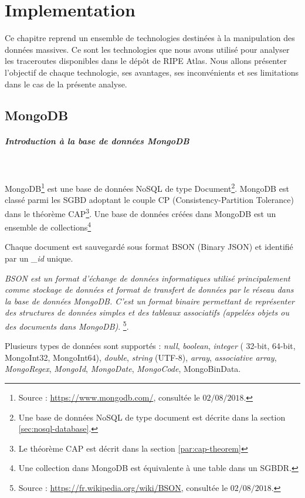 \chapter{Implementation}

Ce chapitre reprend un ensemble de   technologies destinées  à la manipulation des données massives. Ce sont les technologies que nous avons utilisé pour analyser les traceroutes disponibles dans le dépôt de RIPE Atlas. Nous allons présenter l'objectif de chaque technologie, ses avantages, ses inconvénients et ses limitations dans le cas de la présente analyse.


\section{MongoDB}

\paragraph{Introduction à la base de données MongoDB} \label{subsubsection:mongodb}~

MongoDB\footnote{Source : \url{https://www.mongodb.com/}, consultée le $02/08/2018$.} est une base de données  NoSQL de type Document\footnote{Une base de données NoSQL de type document est décrite dans la section \ref{sec:nosql-database}.}.  MongoDB est classé parmi les  SGBD adoptant le couple CP (Consistency-Partition Tolerance) dans le théorème  CAP\footnote{Le théorème  CAP est décrit dans la section \ref{par:cap-theorem}}. Une base de données créées dans MongoDB est un ensemble de collections\footnote{Une collection dans MongoDB est équivalente à une table dans un SGBDR.}




 Chaque document est sauvegardé sous format BSON (Binary JSON) et identifié par un \textit{\_id} unique. 

\begin{tcolorbox}
	\og\textit{BSON est un format d'échange de données informatiques utilisé principalement comme stockage de données et format de transfert de données par le réseau dans la base de données MongoDB. C'est un format binaire permettant de représenter des structures de données simples et des tableaux associatifs (appelées objets ou des documents dans MongoDB)}.\fg{}  \footnote{Source : \url{https://fr.wikipedia.org/wiki/BSON}, consultée le $ 02/08/2018 $.}.
\end{tcolorbox}

Plusieurs types de données sont supportés : \textit{null}, \textit{boolean}, \textit{integer} ( 32-bit, 64-bit, MongoInt32, MongoInt64), \textit{double}, \textit{string} (UTF-8), \textit{array}, \textit{associative array}, \textit{MongoRegex}, \textit{MongoId}, \textit{MongoDate}, \textit{MongoCode}, MongoBinData.

